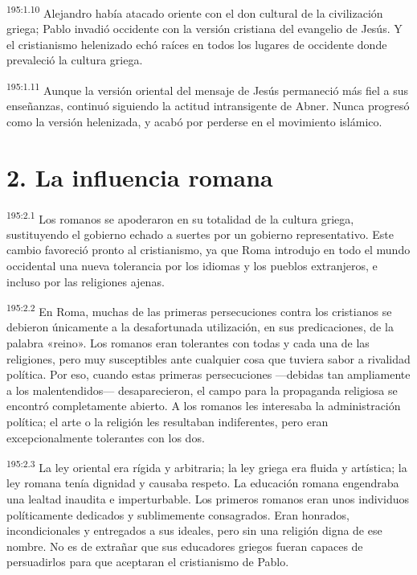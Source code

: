 \par 
\textsuperscript{195:1.10} Alejandro había atacado oriente con el don cultural de la civilización griega; Pablo invadió occidente con la versión cristiana del evangelio de Jesús. Y el cristianismo helenizado echó raíces en todos los lugares de occidente donde prevaleció la cultura griega.

\par 
\textsuperscript{195:1.11} Aunque la versión oriental del mensaje de Jesús permaneció más fiel a sus enseñanzas, continuó siguiendo la actitud intransigente de Abner. Nunca progresó como la versión helenizada, y acabó por perderse en el movimiento islámico.

\section*{2. La influencia romana}
\par 
\textsuperscript{195:2.1} Los romanos se apoderaron en su totalidad de la cultura griega, sustituyendo el gobierno echado a suertes por un gobierno representativo. Este cambio favoreció pronto al cristianismo, ya que Roma introdujo en todo el mundo occidental una nueva tolerancia por los idiomas y los pueblos extranjeros, e incluso por las religiones ajenas.

\par 
\textsuperscript{195:2.2} En Roma, muchas de las primeras persecuciones contra los cristianos se debieron únicamente a la desafortunada utilización, en sus predicaciones, de la palabra «reino». Los romanos eran tolerantes con todas y cada una de las religiones, pero muy susceptibles ante cualquier cosa que tuviera sabor a rivalidad política. Por eso, cuando estas primeras persecuciones ---debidas tan ampliamente a los malentendidos--- desaparecieron, el campo para la propaganda religiosa se encontró completamente abierto. A los romanos les interesaba la administración política; el arte o la religión les resultaban indiferentes, pero eran excepcionalmente tolerantes con los dos.

\par 
\textsuperscript{195:2.3} La ley oriental era rígida y arbitraria; la ley griega era fluida y artística; la ley romana tenía dignidad y causaba respeto. La educación romana engendraba una lealtad inaudita e imperturbable. Los primeros romanos eran unos individuos políticamente dedicados y sublimemente consagrados. Eran honrados, incondicionales y entregados a sus ideales, pero sin una religión digna de ese nombre. No es de extrañar que sus educadores griegos fueran capaces de persuadirlos para que aceptaran el cristianismo de Pablo.

